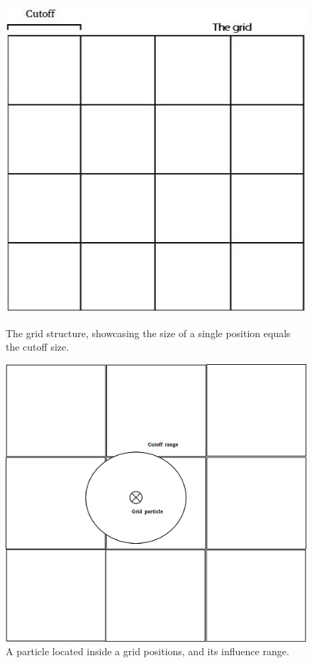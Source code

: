 \documentclass[a4paper,11pt,oneside]{book}
\begin{document}
\begin{figure}[H]
  \centering
  \begin{minipage}[b]{0.4\textwidth}
    \includegraphics[width=\textwidth]{grid.jpg}
    \caption{The grid structure, showcasing the size of a single position equals the cutoff size.}
  \end{minipage}
  \begin{minipage}[b]{0.4\textwidth}
    \includegraphics[width=\textwidth]{gridexample.png}
    \caption{A particle located inside a grid positions, and its influence range.}
  \end{minipage}
\end{figure}
\end{document}
